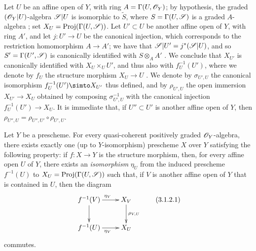 \begin{env}[3.1.1]
Let $U$ be an affine open of $Y$, with ring $A=\Gamma(U,\mathscr{O}_Y)$;
by hypothesis, the graded $(\mathscr{O}_Y|U)$-algebra $\mathscr{S}|U$ is isomorphic to $\widetilde{S}$, where $S=\Gamma(U,\mathscr{S})$ is a graded $A$-algebra ;
set $X_U={\mathop{\mathrm{Proj}}\nolimits}(\Gamma(U,\mathscr{S}))$.
Let $U'\subset U$ be another affine open of $Y$, with ring $A'$, and let $j:U'\to U$ be the canonical injection, which corresponds to the restriction homomorphism $A\to A'$;
we have that $\mathscr{S}|U'=j^*(\mathscr{S}|U)$, and so $S'=\Gamma(U',\mathscr{S})$ is canonically identified with $S\otimes_AA'$ .
We conclude  that $X_{U'}$ is canonically identified with $X_U\times_U U'$, and thus also with $f_U^{-1}(U')$, where we denote by $f_U$ the structure morphism $X_U\to U$ .
We denote by $\sigma_{U',U}$ the canonical isomorphism $f_U^{-1}(U')\simto X_{U'}$ thus defined, and by $\rho_{U',U}$ the open immersion $X_{U'}\to X_U$ obtained by composing $\sigma_{U',U}^{-1}$ with the canonical injection $f_U^{-1}(U')\to X_U$.
It is immediate that, if $U''\subset U'$ is another affine open of $Y$, then $\rho_{U'',U}=\rho_{U'',U'}\circ\rho_{U',U}$.
\end{env}

\begin{proposition}[3.1.2]
\label{II.3.1.2}
Let $Y$ be a prescheme.
For every quasi-coherent positively graded $\mathscr{O}_Y$-algebra, there exists exactly one (up to $Y$-isomorphism) prescheme $X$ over $Y$ satisfying the following property:
if $f:X\to Y$ is the structure morphism, then, for every affine open $U$ of $Y$, there exists an \emph{isomorphism} $\eta_U$ from the induced prescheme $f^{-1}(U)$ to $X_U={\mathop{\mathrm{Proj}}\nolimits}(\Gamma(U,\mathscr{S}))$ such that, if $V$ is another affine open of $Y$ that is contained in $U$, then the diagram
\[
\label{II.3.1.2.1}
  \xymatrix{
    f^{-1}(V) \ar[r]^{\eta_V} \ar[d]
    & X_V \ar[d]^{\rho_{V,U}}
  \\f^{-1}(U) \ar[r]_{\eta_V}
    & X_U
  }
\tag{3.1.2.1}
\]
commutes.
\end{proposition}

